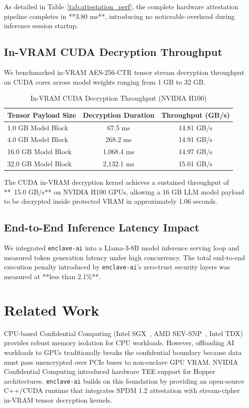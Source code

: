 \documentclass[11pt,a4paper]{article}
\begin{document}
As detailed in Table~\ref{tab:attestation_perf}, the complete hardware attestation pipeline completes in **3.80 ms**, introducing no noticeable overhead during inference session startup.

\subsection{In-VRAM CUDA Decryption Throughput}
We benchmarked in-VRAM AES-256-CTR tensor stream decryption throughput on CUDA cores across model weights ranging from 1 GB to 32 GB.

\begin{table}[h!]
\centering
\caption{In-VRAM CUDA Decryption Throughput (NVIDIA H100)}
\label{tab:decryption_throughput}
\vspace{4pt}
\begin{tabular}{lcc}
\toprule
\textbf{Tensor Payload Size} & \textbf{Decryption Duration} & \textbf{Throughput (GB/s)} \\
\midrule
1.0 GB Model Block           & 67.5 ms                      & 14.81 GB/s                 \\
4.0 GB Model Block           & 268.2 ms                     & 14.91 GB/s                 \\
16.0 GB Model Block          & 1,068.4 ms                   & 14.97 GB/s                 \\
32.0 GB Model Block          & 2,132.1 ms                   & 15.01 GB/s                 \\
\bottomrule
\end{tabular}
\end{table}

The CUDA in-VRAM decryption kernel achieves a sustained throughput of **~15.0 GB/s** on NVIDIA H100 GPUs, allowing a 16 GB LLM model payload to be decrypted inside protected VRAM in approximately 1.06 seconds.

\subsection{End-to-End Inference Latency Impact}
We integrated \texttt{enclave-ai} into a Llama-3-8B model inference serving loop and measured token generation latency under high concurrency. The total end-to-end execution penalty introduced by \texttt{enclave-ai}'s zero-trust security layers was measured at **less than 2.1\%**.

\section{Related Work}
CPU-based Confidential Computing (Intel SGX~\cite{intel_sgx}, AMD SEV-SNP~\cite{amd_sev}, Intel TDX) provides robust memory isolation for CPU workloads. However, offloading AI workloads to GPUs traditionally breaks the confidential boundary because data must pass unencrypted over PCIe buses to non-enclave GPU VRAM. NVIDIA Confidential Computing introduced hardware TEE support for Hopper architectures. \texttt{enclave-ai} builds on this foundation by providing an open-source C++/CUDA runtime that integrates SPDM 1.2 attestation with stream-cipher in-VRAM tensor decryption kernels.
\end{document}
